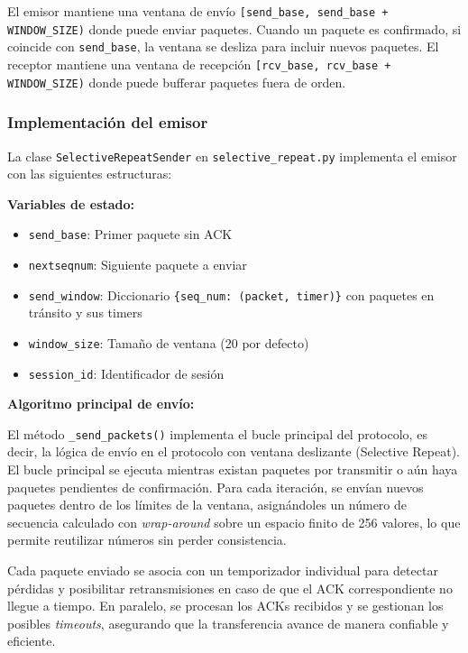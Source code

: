 El emisor mantiene una ventana de envío \texttt{[send\_base, send\_base + WINDOW\_SIZE)} donde puede enviar paquetes. Cuando un paquete es confirmado, si coincide con \texttt{send\_base}, la ventana se desliza para incluir nuevos paquetes. El receptor mantiene una ventana de recepción \texttt{[rcv\_base, rcv\_base + WINDOW\_SIZE)} donde puede bufferar paquetes fuera de orden.

\subsubsection{Implementación del emisor}

La clase \texttt{SelectiveRepeatSender} en \texttt{selective\_repeat.py} implementa el emisor con las siguientes estructuras:

\textbf{Variables de estado:}
\begin{itemize}
    \item \texttt{send\_base}: Primer paquete sin ACK
    \item \texttt{nextseqnum}: Siguiente paquete a enviar
    \item \texttt{send\_window}: Diccionario \texttt{\{seq\_num: (packet, timer)\}} con paquetes en tránsito y sus timers
    \item \texttt{window\_size}: Tamaño de ventana (20 por defecto)
    \item \texttt{session\_id}: Identificador de sesión
\end{itemize}

\textbf{Algoritmo principal de envío:}

El método \texttt{\_send\_packets()} implementa el bucle principal del protocolo, es decir, la lógica de envío en el protocolo con ventana deslizante (Selective Repeat).
\\

El bucle principal se ejecuta mientras existan paquetes por transmitir o aún haya paquetes pendientes de confirmación. Para cada iteración, se envían nuevos paquetes dentro de los límites de la ventana, asignándoles un número de secuencia calculado con \textit{wrap-around} sobre un espacio finito de 256 valores, lo que permite reutilizar números sin perder consistencia.

Cada paquete enviado se asocia con un temporizador individual para detectar pérdidas y posibilitar retransmisiones en caso de que el ACK correspondiente no llegue a tiempo. En paralelo, se procesan los ACKs recibidos y se gestionan los posibles \textit{timeouts}, asegurando que la transferencia avance de manera confiable y eficiente.

